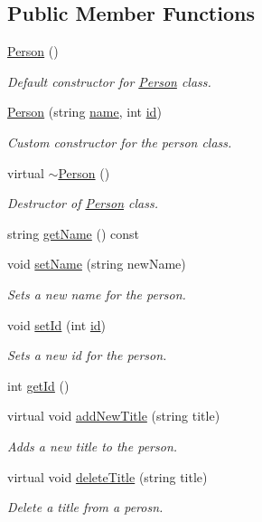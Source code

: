 \subsection*{Public Member Functions}
\begin{DoxyCompactItemize}
\item 
\hyperlink{class_person_a0397c6f89fafc12e738923f612bc41a3}{Person} ()
\begin{DoxyCompactList}\small\item\em Default constructor for \hyperlink{class_person}{Person} class. \end{DoxyCompactList}\item 
\hyperlink{class_person_a89a3ed74790668699f46f5cfbcd16bd0}{Person} (string \hyperlink{class_person_a669b64897b4d823a27bb5866368d4dfa}{name}, int \hyperlink{class_person_aec48a92f614a854ff380a15eb8e2f479}{id})
\begin{DoxyCompactList}\small\item\em Custom constructor for the person class. \end{DoxyCompactList}\item 
virtual \hyperlink{class_person_a6b5729bb56531c93312b1179c8ee4b71}{$\sim$\+Person} ()
\begin{DoxyCompactList}\small\item\em Destructor of \hyperlink{class_person}{Person} class. \end{DoxyCompactList}\item 
string \hyperlink{class_person_a9db2e2ccfc6cfa0d7979613ec2aaa922}{get\+Name} () const
\item 
void \hyperlink{class_person_a0f6294ead76bdac161bc71854799b09c}{set\+Name} (string new\+Name)
\begin{DoxyCompactList}\small\item\em Sets a new name for the person. \end{DoxyCompactList}\item 
void \hyperlink{class_person_ae08bf551df2688cd866c41b5d9cb8f1c}{set\+Id} (int \hyperlink{class_person_aec48a92f614a854ff380a15eb8e2f479}{id})
\begin{DoxyCompactList}\small\item\em Sets a new id for the person. \end{DoxyCompactList}\item 
int \hyperlink{class_person_afd0359228a09c4adcffe31f456046717}{get\+Id} ()
\item 
virtual void \hyperlink{class_person_a1f6361e735885ead2549717bb31d0437}{add\+New\+Title} (string title)
\begin{DoxyCompactList}\small\item\em Adds a new title to the person. \end{DoxyCompactList}\item 
virtual void \hyperlink{class_person_a14f687637476ef033a3c9b865e67fd69}{delete\+Title} (string title)
\begin{DoxyCompactList}\small\item\em Delete a title from a perosn. \end{DoxyCompactList}\end{DoxyCompactItemize}
